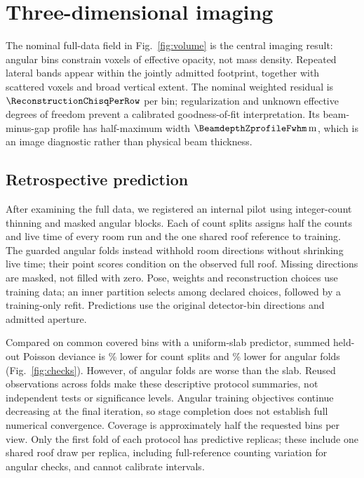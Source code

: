 \section{Three-dimensional imaging}\label{sec:volume}
The nominal full-data field in Fig.~\ref{fig:volume} is the central imaging result: \ReconstructionRows{} angular bins constrain \ReconstructionVoxels{} voxels of effective opacity, not mass density. Repeated lateral bands appear within the jointly admitted footprint, together with scattered voxels and broad vertical extent. The nominal weighted residual is $\ReconstructionChisqPerRow$ per bin; regularization and unknown effective degrees of freedom prevent a calibrated goodness-of-fit interpretation. Its beam-minus-gap profile has half-maximum width $\BeamdepthZprofileFwhm\,\mathrm{m}$, which is an image diagnostic rather than physical beam thickness.

\subsection{Retrospective prediction}
After examining the full data, we registered an internal pilot using integer-count thinning and masked angular blocks. Each of \InternalCountFolds{} count splits assigns half the counts and live time of every room run and the one shared roof reference to training. The \InternalAngularFolds{} guarded angular folds instead withhold room directions without shrinking live time; their point scores condition on the observed full roof. Missing directions are masked, not filled with zero. Pose, weights and reconstruction choices use training data; an inner partition selects among declared choices, followed by a training-only refit. Predictions use the original detector-bin directions and admitted aperture.

Compared on common covered bins with a uniform-slab predictor, summed held-out Poisson deviance is \InternalCountImprovementPercent\% lower for count splits and \InternalAngularImprovementPercent\% lower for angular folds (Fig.~\ref{fig:checks}). However, \InternalAngularWorseFolds{} of \InternalAngularFolds{} angular folds are worse than the slab. Reused observations across folds make these descriptive protocol summaries, not independent tests or significance levels. Angular training objectives continue decreasing at the final iteration, so stage completion does not establish full numerical convergence. Coverage is approximately half the requested bins per view. Only the first fold of each protocol has \InternalPredictionUncertaintyReplicas{} predictive replicas; these include one shared roof draw per replica, including full-reference counting variation for angular checks, and cannot calibrate intervals.

